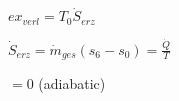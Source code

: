\( ex_{verl} = T_0 \dot{S}_{erz} \)  

\( \dot{S}_{erz} = \dot{m}_{ges} (s_6 - s_0) = \frac{\dot{Q}}{T} \)  

\( = 0 \) (adiabatic)